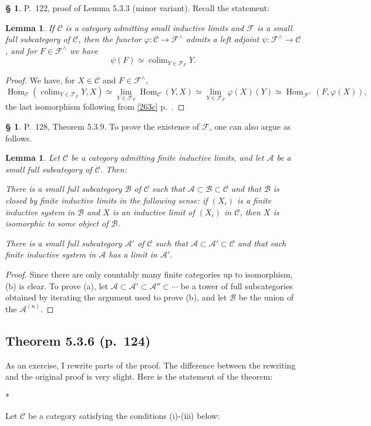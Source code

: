 \documentclass[12pt]{article}
\newtheorem{lem}[thm]{Lemma}
\theoremstyle{remark}
\theoremstyle{definition}
\newtheorem{s}[thm]{\S}
\newcommand{\A}{\mathcal A}
\newcommand{\B}{\mathcal B}
\newcommand{\C}{\mathcal C}
\newcommand{\F}{\mathcal F}
\newcommand{\mv}{ (minor variant)}
\DeclareMathOperator*{\co}{colim}
\DeclareMathOperator{\Hom}{Hom}%
\begin{document}
%
%
\begin{s} 
P.~122, proof of Lemma 5.3.3\mv. Recall the statement: 
%
\begin{lem}
If $\C$ is a category admitting small inductive limits and $\F$ is a small full subcategory of $\C$, then the functor $\varphi:\C\to\F^\wedge$ admits a left adjoint $\psi:\F^\wedge\to\C$, and for $F\in\F^\wedge$ we have 
$$
\psi(F)\simeq\co_{Y\in\F_F}Y. 
$$ 
\end{lem} 
%
\begin{proof}
We have, for $X\in\C$ and $F\in\F^\wedge$, 
$$
\Hom_\C\left(\co_{Y\in\F_F}Y,X\right)\simeq\lim_{Y\in\F_F}\Hom_\C(Y,X)
\simeq\lim_{Y\in\F_F}\varphi(X)(Y)\simeq\Hom_{\F^\wedge}(F,\varphi(X)),
$$  
the last isomorphism following from \eqref{263c} p.~\pageref{263c}.
\end{proof}
\end{s}
%
%
\begin{s} 
P.~128, Theorem 5.3.9. To prove the existence of $\F$, one can also argue as follows. 
%
\begin{lem} 
%
Let $\C$ be a category admitting finite inductive limits, and let $\A$ be a small full subcategory of $\C$. Then:

 There is a small full subcategory $\B$ of $\C$ such that $\A\subset\B\subset \C$ and that $\B$ is closed by finite inductive limits in the following sense: if $(X_i)$ is a finite inductive system in $\B$ and $X$ is an inductive limit of $(X_i)$ in $\C$, then $X$ is isomorphic to some object of $\B$.

 There is a small full subcategory $\A'$ of $\C$ such that $\A\subset\A'\subset \C$ and that each finite inductive system in $\A$ has a limit in $\A'$. 
%
\end{lem} 
%
\begin{proof}
Since there are only countably many finite categories up to isomorphism, (b) is clear. To prove (a), let $\A\subset\A'\subset\A''\subset\cdots$ be a tower of full subcategories obtained by iterating the argument used to prove (b), and let $\B$ be the union of the $\A^{(n)}$.
\end{proof}
\end{s}
%
%
\subsection{Theorem 5.3.6 (p.~124)}\label{536}
%
As an exercise, I rewrite parts of the proof. The difference between the rewriting and the original proof is very slight. Here is the statement of the theorem:%
%
\begin{center}*\end{center}
%
Let $\C$ be a category satisfying the conditions (i)-(iii) below:
\end{document}
